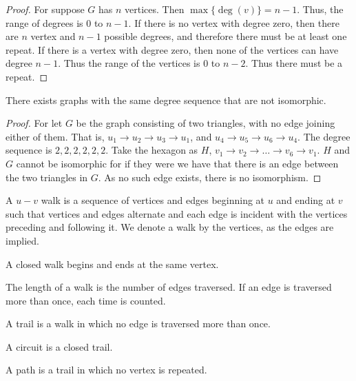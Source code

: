     \begin{proof}
    For suppose $G$ has $n$ vertices. Then $\max\{\deg(v)\} = n-1$. Thus, the range of degrees is $0$ to $n-1$. If there is no vertex with degree zero, then there are $n$ vertex and $n-1$ possible degrees, and therefore there must be at least one repeat. If there is a vertex with degree zero, then none of the vertices can have degree $n-1$. Thus the range of the vertices is $0$ to $n-2$. Thus there must be a repeat. 
    \end{proof}
    \begin{theorem}
    There exists graphs with the same degree sequence that are not
    isomorphic.
    \end{theorem}
    \begin{proof}
    For let $G$ be the graph consisting of two triangles, with no edge joining either of them. That is, $u_1\rightarrow u_2 \rightarrow u_3\rightarrow u_1$, and $u_4\rightarrow u_5 \rightarrow u_6 \rightarrow u_4$. The degree sequence is $2,2,2,2,2,2$. Take the hexagon as $H$, $v_1\rightarrow v_2 \rightarrow \hdots \rightarrow v_6 \rightarrow v_1$. $H$ and $G$ cannot be isomorphic for if they were we have that there is an edge between the two triangles in $G$. As no such edge exists, there is no isomorphism.
    \end{proof}
    \begin{definition}
    A $u-v$ walk is a sequence of vertices and edges beginning at $u$ and ending at $v$ such that vertices and edges alternate and each edge is incident with the vertices preceding and following it. We denote a walk by the vertices, as the edges are implied.
    \end{definition}
    \begin{definition}
    A closed walk begins and ends at the same vertex.
    \end{definition}
    \begin{definition}
    The length of a walk is the number of edges traversed. If an edge is traversed more than once, each time is counted.
    \end{definition}
    \begin{definition}
    A trail is a walk in which no edge is traversed more than once.
    \end{definition}
    \begin{definition} A circuit is a closed trail.
    \end{definition}
    \begin{definition}
    A path is a trail in which no vertex is repeated.
    \end{definition}

